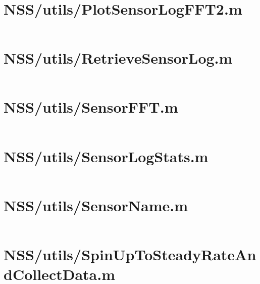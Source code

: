 \pagebreak
\section*{NSS/utils/PlotSensorLogFFT2.m}\label{code:NSS/utils/PlotSensorLogFFT2.m}
\inputminted[linenos,fontsize=\scriptsize]{matlab}{/home/dcouture/git/mathyourlife/TSatPy/beta_versions/matlab_object_oriented/utils/PlotSensorLogFFT2.m}

\pagebreak
\section*{NSS/utils/RetrieveSensorLog.m}\label{code:NSS/utils/RetrieveSensorLog.m}
\inputminted[linenos,fontsize=\scriptsize]{matlab}{/home/dcouture/git/mathyourlife/TSatPy/beta_versions/matlab_object_oriented/utils/RetrieveSensorLog.m}

\pagebreak
\section*{NSS/utils/SensorFFT.m}\label{code:NSS/utils/SensorFFT.m}
\inputminted[linenos,fontsize=\scriptsize]{matlab}{/home/dcouture/git/mathyourlife/TSatPy/beta_versions/matlab_object_oriented/utils/SensorFFT.m}

\pagebreak
\section*{NSS/utils/SensorLogStats.m}\label{code:NSS/utils/SensorLogStats.m}
\inputminted[linenos,fontsize=\scriptsize]{matlab}{/home/dcouture/git/mathyourlife/TSatPy/beta_versions/matlab_object_oriented/utils/SensorLogStats.m}

\pagebreak
\section*{NSS/utils/SensorName.m}\label{code:NSS/utils/SensorName.m}
\inputminted[linenos,fontsize=\scriptsize]{matlab}{/home/dcouture/git/mathyourlife/TSatPy/beta_versions/matlab_object_oriented/utils/SensorName.m}

\pagebreak
\section*{NSS/utils/SpinUpToSteadyRateAndCollectData.m}\label{code:NSS/utils/SpinUpToSteadyRateAndCollectData.m}
\inputminted[linenos,fontsize=\scriptsize]{matlab}{/home/dcouture/git/mathyourlife/TSatPy/beta_versions/matlab_object_oriented/utils/SpinUpToSteadyRateAndCollectData.m}

